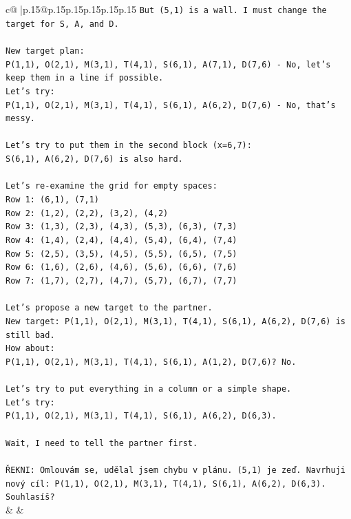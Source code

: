 \documentclass{article}
\begin{document}
{\begin{supertabular}{c@{$\;$}|p{.15\linewidth}@{}p{.15\linewidth}p{.15\linewidth}p{.15\linewidth}p{.15\linewidth}p{.15\linewidth}}
{{{\texttt{But (5,1) is a wall. I must change the target for S, A, and D.} \\
\\ 
\texttt{New target plan:} \\
\texttt{P(1,1), O(2,1), M(3,1), T(4,1), S(6,1), A(7,1), D(7,6) {-} No, let's keep them in a line if possible.} \\
\texttt{Let's try:} \\
\texttt{P(1,1), O(2,1), M(3,1), T(4,1), S(6,1), A(6,2), D(7,6) {-} No, that's messy.} \\
\\ 
\texttt{Let's try to put them in the second block (x=6,7):} \\
\texttt{S(6,1), A(6,2), D(7,6) is also hard.} \\
\\ 
\texttt{Let's re{-}examine the grid for empty spaces:} \\
\texttt{Row 1: (6,1), (7,1)} \\
\texttt{Row 2: (1,2), (2,2), (3,2), (4,2)} \\
\texttt{Row 3: (1,3), (2,3), (4,3), (5,3), (6,3), (7,3)} \\
\texttt{Row 4: (1,4), (2,4), (4,4), (5,4), (6,4), (7,4)} \\
\texttt{Row 5: (2,5), (3,5), (4,5), (5,5), (6,5), (7,5)} \\
\texttt{Row 6: (1,6), (2,6), (4,6), (5,6), (6,6), (7,6)} \\
\texttt{Row 7: (1,7), (2,7), (4,7), (5,7), (6,7), (7,7)} \\
\\ 
\texttt{Let's propose a new target to the partner.} \\
\texttt{New target: P(1,1), O(2,1), M(3,1), T(4,1), S(6,1), A(6,2), D(7,6) is still bad.} \\
\texttt{How about:} \\
\texttt{P(1,1), O(2,1), M(3,1), T(4,1), S(6,1), A(1,2), D(7,6)? No.} \\
\\ 
\texttt{Let's try to put everything in a column or a simple shape.} \\
\texttt{Let's try:} \\
\texttt{P(1,1), O(2,1), M(3,1), T(4,1), S(6,1), A(6,2), D(6,3).} \\
\\ 
\texttt{Wait, I need to tell the partner first.} \\
\\ 
\texttt{ŘEKNI: Omlouvám se, udělal jsem chybu v plánu. (5,1) je zeď. Navrhuji nový cíl: P(1,1), O(2,1), M(3,1), T(4,1), S(6,1), A(6,2), D(6,3). Souhlasíš?} \\
            }
        }
    }
    & & \\ \\


\end{supertabular}}
\end{document}
